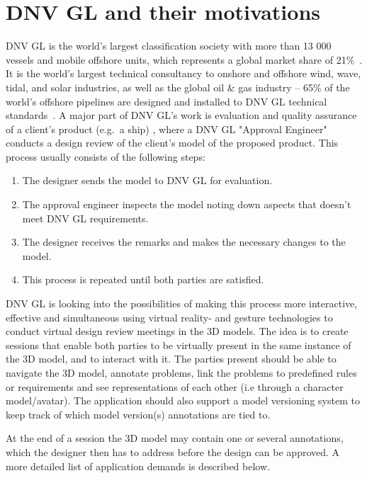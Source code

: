 \section{DNV GL and their motivations}
DNV GL is the world's largest classification society with more than 13 000 vessels and mobile offshore units, which represents a global market share of 21\%~\citep{TO:DNVGL}. It is the world's largest technical consultancy to onshore and offshore wind, wave, tidal, and solar industries, as well as the global oil \& gas industry -- 65\% of the world’s offshore pipelines are designed and installed to DNV GL technical standards~\citep{MTN:DNVGL}. A major part of DNV GL's work is evaluation and quality assurance of a client's product (e.g.~a ship) , where a DNV GL "Approval Engineer" conducts a design review of the client's model of the proposed product. This process usually consists of the following steps: 

\begin{enumerate}
	\item The designer sends the model to DNV GL for evaluation.
	\item The approval engineer inspects the model noting down aspects that doesn't meet DNV GL requirements.
	\item The designer receives the remarks and makes the necessary changes to the model.
	\item This process is repeated until both parties are satisfied.
\end{enumerate}

DNV GL is looking into the possibilities of making this process more interactive, effective and simultaneous using virtual reality- and gesture technologies to conduct virtual design review meetings in the 3D models. The idea is to create sessions that enable both parties to be virtually present in the same instance of the 3D model, and to interact with it. The parties present should be able to navigate the 3D model, annotate problems, link the problems to predefined rules or requirements and see representations of each other (i.e through a character model/avatar). The application should also support a model versioning system to keep track of which model version(s) annotations are tied to.

At the end of a session the 3D model may contain one or several annotations, which the designer then has to address before the design can be approved. A more detailed list of application demands is described below.
